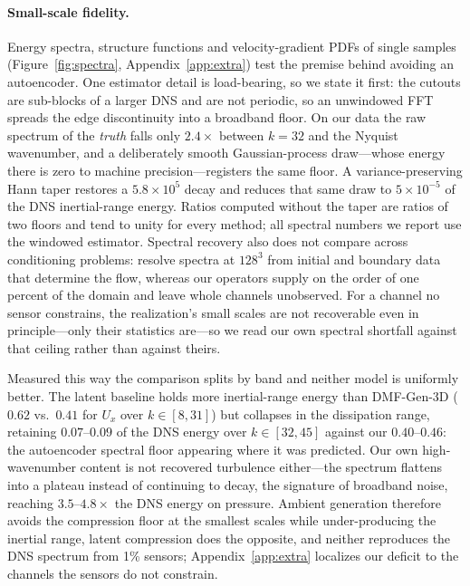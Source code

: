 \documentclass{article} %
\newcommand{\model}{DMF-Gen-3D}
\begin{document}
\paragraph{Small-scale fidelity.} Energy spectra, structure functions and velocity-gradient PDFs of single samples (Figure~\ref{fig:spectra}, Appendix~\ref{app:extra}) test the premise behind avoiding an autoencoder. One estimator detail is load-bearing, so we state it first: the cutouts are sub-blocks of a larger DNS and are not periodic, so an unwindowed FFT spreads the edge discontinuity into a broadband floor. On our data the raw spectrum of the \emph{truth} falls only $2.4\times$ between $k{=}32$ and the Nyquist wavenumber, and a deliberately smooth Gaussian-process draw---whose energy there is zero to machine precision---registers the same floor. A variance-preserving Hann taper restores a $5.8\times10^{5}$ decay and reduces that same draw to $5\times10^{-5}$ of the DNS inertial-range energy. Ratios computed without the taper are ratios of two floors and tend to unity for every method; all spectral numbers we report use the windowed estimator. Spectral recovery also does not compare across conditioning problems: \citet{raonic2026gencfd} resolve spectra at $128^3$ from initial and boundary data that determine the flow, whereas our operators supply on the order of one percent of the domain and leave whole channels unobserved. For a channel no sensor constrains, the realization's small scales are not recoverable even in principle---only their statistics are---so we read our own spectral shortfall against that ceiling rather than against theirs.

Measured this way the comparison splits by band and neither model is uniformly better. The latent baseline holds more inertial-range energy than \model{} ($0.62$ vs.\ $0.41$ for $U_x$ over $k\in[8,31]$) but collapses in the dissipation range, retaining $0.07$--$0.09$ of the DNS energy over $k\in[32,45]$ against our $0.40$--$0.46$: the autoencoder spectral floor \citep{rafiq2026spectrally,glaws2020deep} appearing where it was predicted. Our own high-wavenumber content is not recovered turbulence either---the spectrum flattens into a plateau instead of continuing to decay, the signature of broadband noise, reaching $3.5$--$4.8\times$ the DNS energy on pressure. Ambient generation therefore avoids the compression floor at the smallest scales while under-producing the inertial range, latent compression does the opposite, and neither reproduces the DNS spectrum from 1\% sensors; Appendix~\ref{app:extra} localizes our deficit to the channels the sensors do not constrain.
\end{document}
